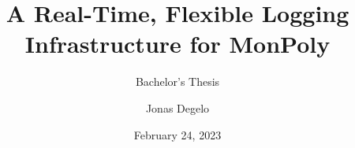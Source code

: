 \documentclass{beamer}
\title{A Real-Time, Flexible Logging Infrastructure for MonPoly}
\subtitle{Bachelor's Thesis}
\author{Jonas Degelo}
\institute{ETH Zürich}
\date{February 24, 2023}
\begin{document}
\begin{frame}
\titlepage
\end{frame}






\end{document}

